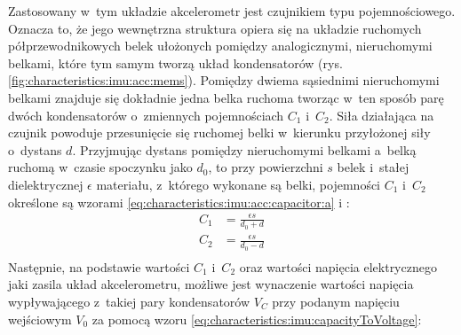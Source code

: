 																																											
Zastosowany w~tym układzie akcelerometr jest czujnikiem typu pojemnościowego. Oznacza to, że jego wewnętrzna struktura opiera się na układzie ruchomych półprzewodnikowych belek ułożonych pomiędzy analogicznymi, nieruchomymi belkami, które tym samym tworzą układ kondensatorów (rys. \ref{fig:characteristics:imu:acc:mems}). Pomiędzy dwiema sąsiednimi nieruchomymi belkami znajduje się dokładnie jedna belka ruchoma tworząc w~ten sposób parę dwóch kondensatorów o~zmiennych pojemnościach $C_1$ i~$C_2$. Siła działająca na czujnik powoduje przesunięcie się ruchomej belki w~kierunku przyłożonej siły o~dystans $d$. Przyjmując dystans pomiędzy nieruchomymi belkami a~belką ruchomą w~czasie spoczynku jako $d_0$, to przy powierzchni $s$ belek i~stałej dielektrycznej $\epsilon$ materiału, z~którego wykonane są belki, pojemności $C_1$ i~$C_2$ określone są wzorami \ref{eq:characteristics:imu:acc:capacitor:a} i \label{eq:characteristics:imu:acc:capacitor:b}:																																												
\begin{subequations}
	\begin{align}
		C_1 & = \frac{\epsilon s}{d_0 + d}\label{eq:characteristics:imu:acc:capacitor:a} \\ 
		C_2 & = \frac{\epsilon s}{d_0 - d}\label{eq:characteristics:imu:acc:capacitor:b} \\		
	\end{align}
\end{subequations}																																												
Następnie, na podstawie wartości $C_1$ i~$C_2$ oraz wartości napięcia elektrycznego jaki zasila układ akcelerometru, możliwe jest wynaczenie wartości napięcia wypływającego z~takiej pary kondensatorów $V_C$ przy podanym napięciu wejściowym $V_0$ za pomocą wzoru \ref{eq:characteristics:imu:capacityToVoltage}:
				
